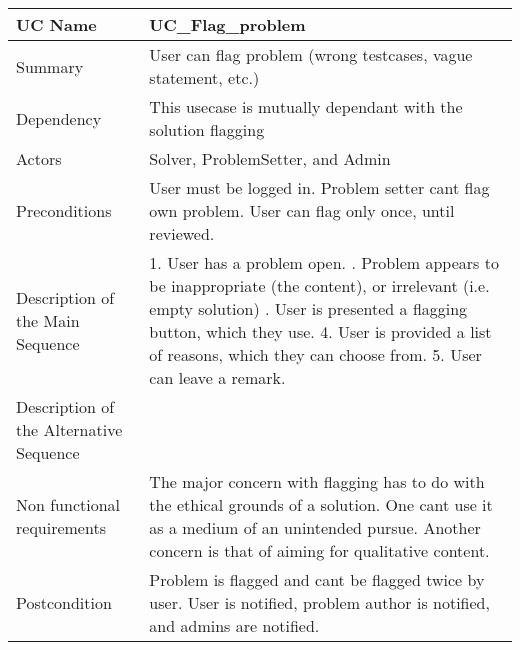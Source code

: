 \begin{table}[htbp]
\centering
\begin{tabularx}{\textwidth}{|l|X|}
\hline
UC Name & UC\_Flag\_problem \\ \hline

Summary &  User can flag problem (wrong testcases, vague statement, etc.) \\ \hline

Dependency & This usecase is mutually dependant with the solution flagging \\ \hline

Actors & Solver, ProblemSetter, and Admin \\ \hline

Preconditions & \- User must be logged in. \newline \- Problem setter cant flag own problem. \newline \- User can flag only once, until reviewed. \\ \hline

Description of the Main Sequence & 1. User has a problem open. \newline 2. Problem appears to be inappropriate (the content), or irrelevant (i.e. empty solution) \newline 3. User is presented a flagging button, which they use. 4. User is provided a list of reasons, which they can choose from. 5. User can leave a remark. \\ \hline

Description of the Alternative Sequence & \- \\ \hline

Non functional requirements & \- The major concern with flagging has to do with the ethical grounds of a solution. One cant use it as a medium of an unintended pursue. \newline \- Another concern is that of aiming for qualitative content. \\ \hline

Postcondition & \- Problem is flagged and cant be flagged twice by user. \newline \- User is notified, problem author is notified, and admins are notified. \\ \hline

\end{tabularx}
\end{table}

